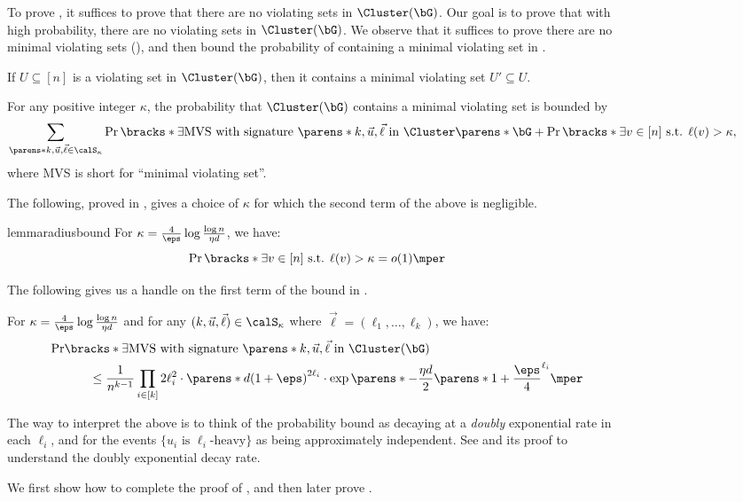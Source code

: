 \documentclass[11pt,letterpaper]{article}
\begin{document}
\begin{figure}
\begin{figure}
    
    To prove , it suffices to prove that there are no violating sets in $\Cluster(\bG)$. %
    Our goal is to prove that with high probability, there are no violating sets in $\Cluster(\bG)$.
    We observe that it suffices to prove there are no minimal violating sets (), and then bound the probability of containing a minimal violating set in .
    \begin{observation} \label{obs:min-violating-set}
        If $U\subseteq[n]$ is a violating set in $\Cluster(\bG)$, then it contains a minimal violating set $U'\subseteq U$. %
    \end{observation}
    \begin{observation} \label{obs:MVS-bound}
        For any positive integer $\kappa$, the probability that $\Cluster(\bG)$ contains a minimal violating set is bounded by
        \[
            \sum_{\parens*{k,\vec{u},\vec{\ell}}\in\calS_{\kappa}} \Pr\bracks*{\exists\text{MVS with signature }\parens*{k,\vec{u},\vec{\ell}}\text{ in }\Cluster\parens*{\bG} } + \Pr\bracks*{\exists v\in[n]\text{ s.t. }\ell(v) > \kappa},
        \]
        where MVS is short for ``minimal violating set''.
    \end{observation}


    The following, proved in , gives a choice of $\kappa$ for which the second term of the above is negligible.
    \begin{restatable}{lemma}{radiusbound} \label{lem:radius-bound}
        For $\kappa = \frac{4}{\eps}\log\frac{\log n}{\eta d}$, we have:
        \[
            \Pr\bracks*{\exists v\in[n]\text{ s.t. }\ell(v)>\kappa} = o(1)\mper
        \]
    \end{restatable}
    The following gives us a handle on the first term of the bound in .
    \begin{lemma}   \label{lem:single-signature-bound}
        For $\kappa = \frac{4}{\eps}\log\frac{\log n}{\eta d}$ and for any $(k,\vec{u},\vec{\ell})\in\calS_{\kappa}$ where $\vec{\ell} = (\ell_1,\dots,\ell_k)$, we have:
        \begin{align*}
            \Pr&\bracks*{\exists\text{MVS with signature }\parens*{k,\vec{u},\vec{\ell}} \text{ in }\Cluster(\bG) } \\
            &\qquad\le \frac{1}{n^{k-1}}\prod_{i\in[k]} 2\ell_i^2\cdot\parens*{d(1+\eps)}^{2\ell_i}\cdot\exp\parens*{-\frac{\eta d}{2}\parens*{1+\frac{\eps}{4}}^{\ell_i}}\mper
        \end{align*}
    \end{lemma}
    \begin{remark}
        The way to interpret the above is to think of the probability bound as decaying at a \emph{doubly} exponential rate in each $\ell_i$, and for the events $\{u_i\text{ is }\ell_i\text{-heavy}\}$ as being approximately independent.
        See  and its proof to understand the doubly exponential decay rate.
    \end{remark}
    We first show how to complete the proof of , and then later prove .


\end{figure}
\end{figure}
\end{document}
